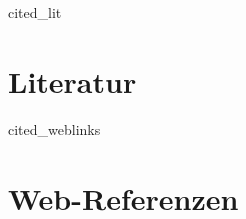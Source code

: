 \thispagestyle{empty}



\begin{btSect}[plain]{cited_lit}
\section*{Literatur}
\setlength{\bibhang}{2em}
\btPrintCited
\end{btSect}

\nocite{*} 
\begin{btSect}[plain]{cited_weblinks}
\section*{Web-Referenzen}
\setlength{\bibhang}{2em}
\btPrintCited
\end{btSect}

